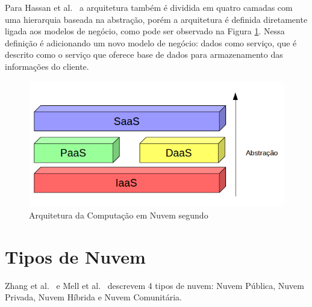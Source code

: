 Para Hassan et al.~\citeyearpar{demystifingCloud:2011} a arquitetura também é dividida em quatro camadas com uma hierarquia baseada na abstração, porém a arquitetura é definida diretamente ligada aos modelos de negócio, como pode ser observado na Figura \ref{architecture2}. Nessa definição é adicionando um novo modelo de negócio: dados como serviço, que é descrito como o serviço que oferece base de dados para armazenamento das informações do cliente. 

\begin{figure}[htbp]
  \centering \includegraphics[scale=.6]{imgs/architecture2.png}
\caption{Arquitetura da Computação em Nuvem segundo~\citep{demystifingCloud:2011}} 
\label{architecture2}
\end{figure}

\section{Tipos de Nuvem} \label{cloud:types}

	Zhang et al.~\citeyearpar{stateOfArt:2010} e Mell et al.~\citeyearpar{NIST:2011} descrevem 4 tipos de nuvem: Nuvem Pública, Nuvem Privada, Nuvem Híbrida e Nuvem Comunitária.

